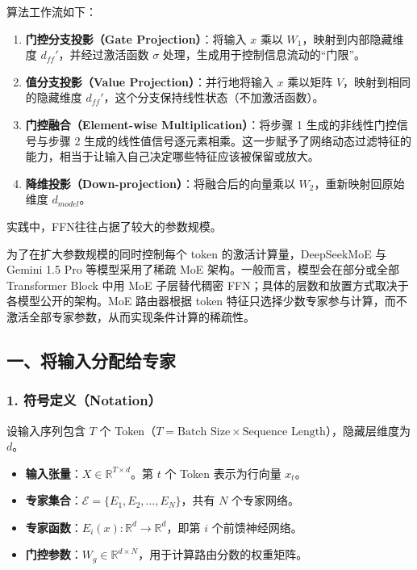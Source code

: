 算法工作流如下：

\begin{enumerate}
\def\labelenumi{\arabic{enumi}.}
\tightlist
\item
  \textbf{门控分支投影（Gate Projection）}：将输入 \(x\) 乘以 \(W_1\)，映射到内部隐藏维度 \(d_{ff}'\)，并经过激活函数 \(\sigma\) 处理，生成用于控制信息流动的``门限''。
\item
  \textbf{值分支投影（Value Projection）}：并行地将输入 \(x\) 乘以矩阵 \(V\)，映射到相同的隐藏维度 \(d_{ff}'\)，这个分支保持线性状态（不加激活函数）。
\item
  \textbf{门控融合（Element-wise Multiplication）}：将步骤 1 生成的非线性门控信号与步骤 2 生成的线性值信号逐元素相乘。这一步赋予了网络动态过滤特征的能力，相当于让输入自己决定哪些特征应该被保留或放大。
\item
  \textbf{降维投影（Down-projection）}：将融合后的向量乘以 \(W_2\)，重新映射回原始维度 \(d_{model}\)。
\end{enumerate}

实践中，FFN往往占据了较大的参数规模。

为了在扩大参数规模的同时控制每个 token 的激活计算量，DeepSeekMoE 与 Gemini 1.5 Pro 等模型采用了稀疏 MoE 架构。一般而言，模型会在部分或全部 Transformer Block 中用 MoE 子层替代稠密 FFN；具体的层数和放置方式取决于各模型公开的架构。MoE 路由器根据 token 特征只选择少数专家参与计算，而不激活全部专家参数，从而实现条件计算的稀疏性。

\hypertarget{ux4e00ux5c06ux8f93ux5165ux5206ux914dux7ed9ux4e13ux5bb6}{%
\subsection{一、将输入分配给专家}\label{ux4e00ux5c06ux8f93ux5165ux5206ux914dux7ed9ux4e13ux5bb6}}

\hypertarget{ux7b26ux53f7ux5b9aux4e49notation}{%
\subsubsection{1. 符号定义（Notation）}\label{ux7b26ux53f7ux5b9aux4e49notation}}

设输入序列包含 \(T\) 个 Token（\(T=\text{Batch Size} \times \text{Sequence Length}\)），隐藏层维度为 \(d\)。

\begin{itemize}
\tightlist
\item
  \textbf{输入张量}：\(X \in \mathbb{R}^{T \times d}\)。第 \(t\) 个 Token 表示为行向量 \(x_t\)。
\item
  \textbf{专家集合}：\(\mathcal{E}=\{E_1,E_2,\ldots,E_N\}\)，共有 \(N\) 个专家网络。
\item
  \textbf{专家函数}：\(E_i(x): \mathbb{R}^d \to \mathbb{R}^d\)，即第 \(i\) 个前馈神经网络。
\item
  \textbf{门控参数}：\(W_g \in \mathbb{R}^{d \times N}\)，用于计算路由分数的权重矩阵。
\end{itemize}

